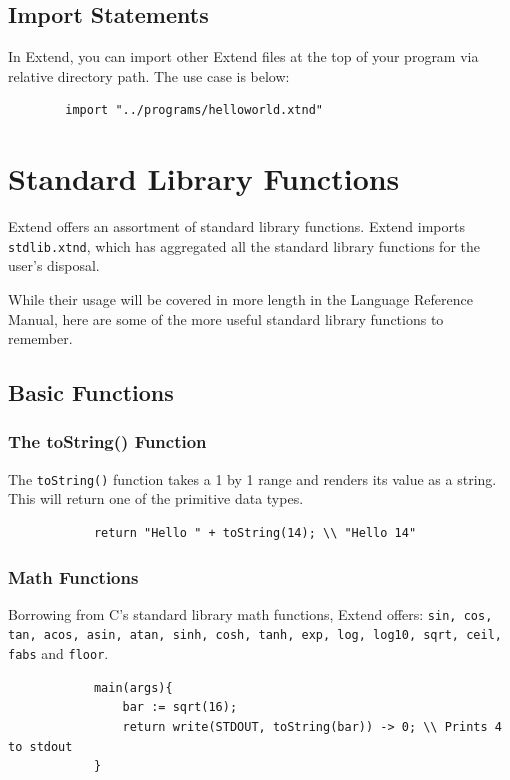 	\subsection{Import Statements}
	In Extend, you can import other Extend files at the top of your program via relative directory path. The use case is below:

	\begin{lstlisting}
		import "../programs/helloworld.xtnd"
	\end{lstlisting}

\section{Standard Library Functions}
Extend offers an assortment of standard library functions. Extend imports \texttt{stdlib.xtnd}, which has aggregated all the standard library functions for the user's disposal.

\medskip \noindent
While their usage will be covered in more length in the Language Reference Manual, here are some of the more useful standard library functions to remember.
	\subsection{Basic Functions}
		\subsubsection{The toString() Function}
		The \texttt{toString()} function takes a 1 by 1 range and renders its value as a string. This will return one of the primitive data types.

		\begin{lstlisting}
			return "Hello " + toString(14); \\ "Hello 14"
		\end{lstlisting}

		\subsubsection{Math Functions}
		Borrowing from C's standard library math functions, Extend offers: \texttt{sin, cos, tan, acos, asin, atan, sinh, cosh, tanh, exp, log, log10, sqrt, ceil, fabs} and \texttt{floor}.

		\begin{lstlisting}
			main(args){
				bar := sqrt(16);
				return write(STDOUT, toString(bar)) -> 0; \\ Prints 4 to stdout
			}
		\end{lstlisting}

